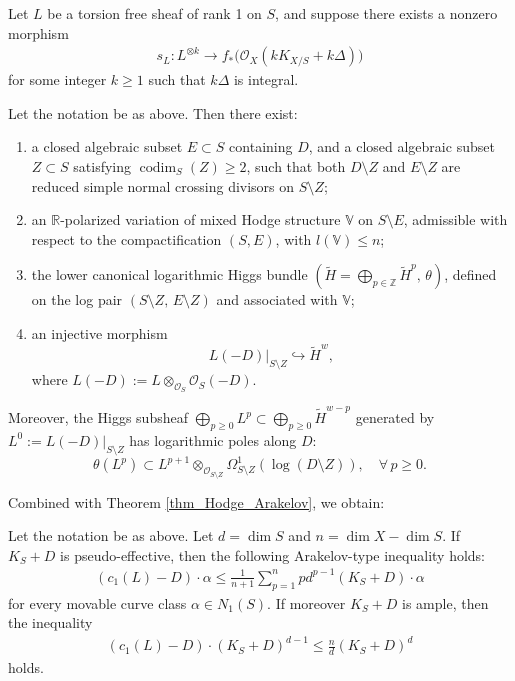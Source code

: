 \documentclass[11pt,letterpaper]{amsart}
\numberwithin{equation}{section}
\begin{document}
Let $L$ be a torsion free sheaf of rank 1 on $S$, and suppose there exists a nonzero morphism  
\begin{align*}
	s_L \colon L^{\otimes k} \to f_*\big(\mathcal{O}_X(kK_{X/S} + k\Delta)\big)  
\end{align*}  
for some integer $k \geq 1$ such that $k\Delta$ is integral.
\begin{thm}\label{thm_VZ_construction}  
	Let the notation be as above. Then there exist:  
	\begin{enumerate}  
		\item[(i)] a closed algebraic subset $E \subset S$ containing $D$, and a closed algebraic subset $Z \subset S$ satisfying $\operatorname{codim}_S(Z) \geq 2$, such that both $D \setminus Z$ and $E \setminus Z$ are reduced simple normal crossing divisors on $S \setminus Z$;  
		\item[(ii)] an $\mathbb{R}$-polarized variation of mixed Hodge structure $\mathbb{V}$ on $S \setminus E$, admissible with respect to the compactification $(S, E)$, with $l(\mathbb{V}) \leq n$;  
		\item[(iii)] the lower canonical logarithmic Higgs bundle $(\widetilde{H} = \bigoplus_{p \in \mathbb{Z}} \widetilde{H}^p,\, \theta)$, defined on the log pair $(S \setminus Z,\, E \setminus Z)$ and associated with $\mathbb{V}$;  
		\item[(iv)] an injective morphism  
		\[
		L(-D)|_{S \setminus Z} \hookrightarrow \widetilde{H}^w,
		\]  
		where $L(-D) := L \otimes_{\mathcal{O}_S} \mathcal{O}_S(-D)$.  
	\end{enumerate}  
	Moreover, the Higgs subsheaf $\bigoplus_{p \geq 0} L^p \subset \bigoplus_{p \geq 0} \widetilde{H}^{w-p}$ generated by $L^0 := L(-D)|_{S \setminus Z}$ has logarithmic poles along $D$:  
	\[
	\theta(L^p) \subset L^{p+1} \otimes_{\mathcal{O}_{S \setminus Z}} \Omega_{S \setminus Z}^1(\log(D \setminus Z)), \quad \forall\, p \geq 0.
	\]
\end{thm}
Combined with Theorem \ref{thm_Hodge_Arakelov}, we obtain:
\begin{thm}\label{thm_VZ_Arakelov}  
	Let the notation be as above. Let $d = \dim S$ and $n = \dim X - \dim S$. If $K_S + D$ is pseudo-effective, then the following Arakelov-type inequality holds:  
	\begin{align*}
		(c_1(L)-D) \cdot \alpha \leq \frac{1}{n + 1}\sum_{p=1}^{n}pd^{p-1}(K_S + D) \cdot \alpha
	\end{align*}  
	for every movable curve class $\alpha \in N_1(S)$.	
	If moreover $K_S+D$ is ample, then the inequality  
	\begin{align*}
		(c_1(L)-D) \cdot(K_S+D)^{d-1} \leq \frac{n}{d}(K_S+D)^{d}
	\end{align*}  
	holds.
\end{thm}
\end{document}
